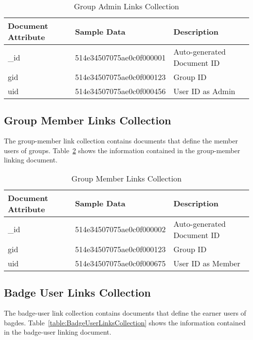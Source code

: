 \begin{table}[H]
\caption{Group Admin Links Collection}\label{table:GroupAdminLinksCollection}
\textbf{ }
\begin{center}
\begin{tabular}{ | l | l |  l | }
\hline
Document Attribute & Sample Data & Description \\ \hline
{\_}id & 514e34507075ae0c0f000001 & Auto-generated Document ID \\ \hline
gid & 514e34507075ae0c0f000123 & Group ID   \\ \hline
uid & 514e34507075ae0c0f000456 & User ID as Admin   \\ \hline
\end{tabular}
\end{center}
\end{table}

\subsection{Group Member Links Collection}
The group-member link collection contains documents that define the member users of groups. Table~\ref{table:GroupMemberLinksCollection} shows the information contained in the group-member linking document.

\begin{table}[H]
\caption{Group Member Links Collection}\label{table:GroupMemberLinksCollection}
\textbf{ }
\begin{center}
\begin{tabular}{ | l | l |  l | }
\hline
Document Attribute & Sample Data & Description \\ \hline
{\_}id & 514e34507075ae0c0f000002 & Auto-generated Document ID \\ \hline
gid & 514e34507075ae0c0f000123 & Group ID   \\ \hline
uid & 514e34507075ae0c0f000675 & User ID as Member   \\ \hline
\end{tabular}
\end{center}
\end{table}


\subsection{Badge User Links Collection}
The badge-user link collection contains documents that define the earner users of bagdes. Table~\ref{table:BadgeUserLinksCollection} shows the information contained in the badge-user linking document.

